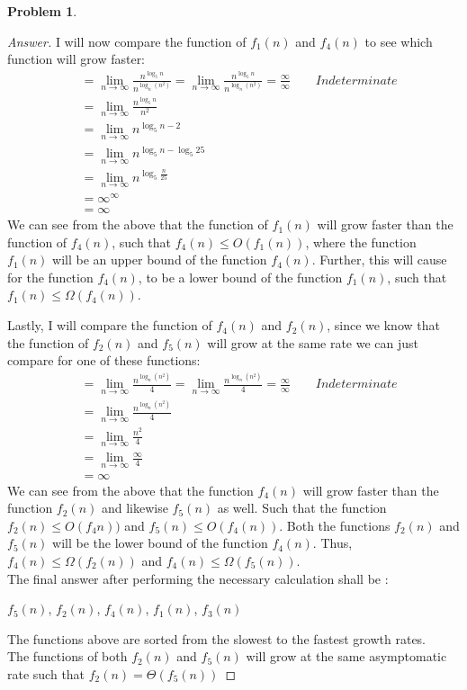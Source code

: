 \documentclass[11pt]{article}
\theoremstyle{definition}
\theoremstyle{definition}
\newtheorem{required}{Problem}
\theoremstyle{definition}
\begin{document}
\begin{required}
\begin{enumerate}[label=(\alph*)]
\begin{proof}[Answer]
I will now compare the function of $f_1(n)$ and  $f_4(n)$ to see which function will grow faster: \\
\begin{align*}
&= \lim_{n \to \infty} \frac{n^{\log_5 n}}{n^{\log_n(n^2)}} = \lim_{n \to \infty} \frac{n^{\log_5 n}}{n^{\log_n(n^2)}}  = \frac{\infty}{\infty} \qquad Indeterminate  \\
&= \lim_{n \to \infty} \frac{n^{\log_5 n}}{n^2} \\
&= \lim_{n \to \infty} n^{{\log_5 n}-{2}} \\
&= \lim_{n \to \infty} n^{{\log_5 n}-{\log_5 25}} \\
&= \lim_{n \to \infty} n^{\log_5 \frac{n}{25}}\\
&= \infty^{\infty}\\
&= \infty
\end{align*} 
We can see from the above that the function of $f_1(n)$ will grow faster than the function of $f_4(n)$, such that $f_4(n) \leq O(f_1(n))$, where the function $f_1(n)$ will be an upper bound of the function $f_4(n)$. Further, this will cause for the function $f_4(n)$, to be a lower bound of the function $f_1(n)$, such that $f_1(n) \leq \Omega(f_4(n))$.

Lastly, I will compare the function of $f_4(n)$ and $f_2(n)$, since we know that the function of $f_2(n)$ and $f_5(n)$ will grow at the same rate we can just compare for one of these functions:\\
\begin{align*}
&= \lim_{n \to \infty} \frac{n^{\log_n(n^2)}}{4} = \lim_{n \to \infty} \frac{n^{\log_n(n^2)}}{4} = \frac{\infty}{\infty} \qquad Indeterminate  \\
&= \lim_{n \to \infty} \frac{n^{\log_n(n^2)}}{4}  \\
&= \lim_{n \to \infty} \frac{n^{2}}{4}\\
&= \lim_{n \to \infty} \frac{\infty}{4} \\
&= \infty
\end{align*} 
We can see from the above that the function $f_4(n)$ will grow faster than the function $f_2(n)$ and likewise $f_5(n)$ as well. Such that the function $f_2(n) \leq O(f_4n))$ and $f_5(n) \leq O(f_4(n))$. Both the functions $f_2(n)$ and $f_5(n)$ will be the lower bound of the function $f_4(n)$. Thus, $f_4(n) \leq \Omega(f_2(n))$ and $f_4(n) \leq \Omega(f_5(n))$. \\

The final answer after performing the necessary calculation shall be : \\
\begin{center}
$f_5(n)$, $f_2(n)$, $f_4(n)$, $f_1(n)$, $f_3(n)$
\end{center}
The functions above are sorted from the slowest to the fastest growth rates. \\
The functions of both $f_2(n)$ and $f_5(n)$ will grow at the same asymptomatic rate such that $f_2(n) = \Theta(f_5(n))$
        \end{proof}
        \newpage


\end{enumerate}
\end{required}
\end{document}
